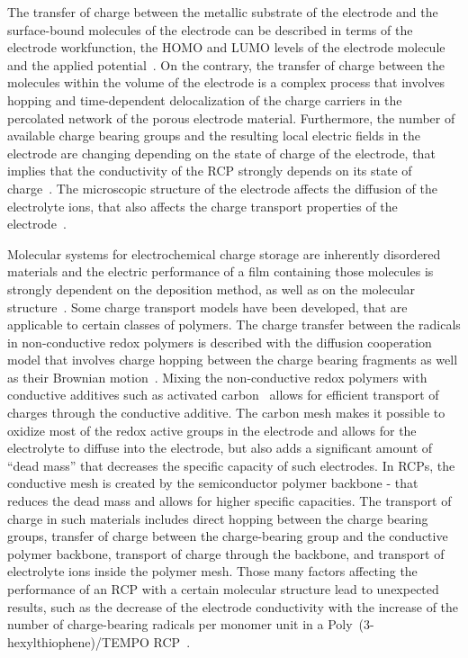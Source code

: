 \par
The transfer of charge between the metallic substrate of the electrode and the surface-bound molecules of the electrode can be described in terms of the electrode workfunction, the HOMO and LUMO levels of the electrode molecule and the applied potential~\cite{Bard_book}. 
On the contrary, the transfer of charge between the molecules within the volume of the electrode is a complex process that involves hopping and time-dependent delocalization of the charge carriers in the percolated network of the porous electrode material. Furthermore, the number of available charge bearing groups and the resulting local electric fields in the electrode are changing depending on the state of charge of the electrode, that implies that the conductivity of the RCP strongly depends on its state of charge~\cite{Zhang2018}.
The microscopic structure of the electrode affects the diffusion of the electrolyte ions, that also affects the charge transport properties of the electrode~\cite{Koshika_2009,He_2022}.\\ 

\par
Molecular systems for electrochemical charge storage are inherently disordered materials and the electric performance of a film containing those molecules is strongly dependent on the deposition method, as well as on the molecular structure~\cite{Xie2021,Zhang2018}. Some charge transport models have been developed, that are applicable to certain classes of polymers. The charge transfer between the radicals in non-conductive redox polymers is described with the diffusion cooperation model that involves charge hopping between the charge bearing fragments as well as their Brownian motion~\cite{Sato2018}. Mixing the non-conductive redox polymers with conductive additives such as activated carbon~\cite{Vereshchagin2022,Daniel2023_Multimodal} allows for efficient transport of charges through the conductive additive. The carbon mesh makes it possible to oxidize most of the redox active groups in the electrode and allows for the electrolyte to diffuse into the electrode, but also adds a significant amount of ``dead mass'' that decreases the specific capacity of such electrodes. In RCPs, the conductive  mesh is created by the semiconductor polymer backbone - that reduces the dead mass and allows for higher specific capacities. The transport of charge in such materials includes direct hopping between the charge bearing groups, transfer of charge between the charge-bearing group and the conductive polymer backbone, transport of charge through the backbone, and transport of electrolyte ions inside the polymer mesh. Those many factors affecting the performance of an RCP with a certain molecular structure lead to unexpected results, such as the decrease of the electrode conductivity with the increase of the number of charge-bearing radicals per monomer unit in a Poly~(3-hexylthiophene)/TEMPO RCP~\cite{Zhang2018}.

